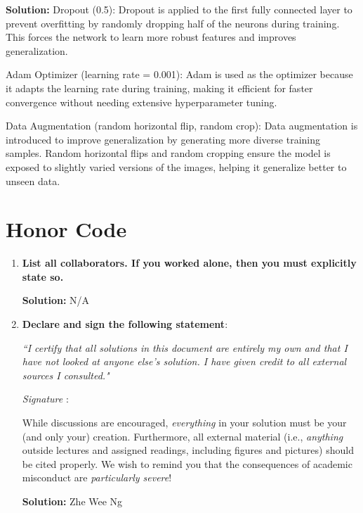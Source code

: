 \documentclass{article}
\newcommand{\Question}[1]{\Large \section{ #1 } \normalsize}
\newenvironment{solution}{\color{blue} \smallskip \textbf{Solution:}}{}
\begin{document}
\begin{solution}
Dropout (0.5): Dropout is applied to the first fully connected layer to prevent overfitting by randomly dropping half of the neurons during training. This forces the network to learn more robust features and improves generalization.

Adam Optimizer (learning rate = 0.001): Adam is used as the optimizer because it adapts the learning rate during training, making it efficient for faster convergence without needing extensive hyperparameter tuning.

Data Augmentation (random horizontal flip, random crop): Data augmentation is introduced to improve generalization by generating more diverse training samples. Random horizontal flips and random cropping ensure the model is exposed to slightly varied versions of the images, helping it generalize better to unseen data.


\end{solution}

\newpage
\Question{Honor Code}

\begin{enumerate}
    \item 
    \textbf{List all collaborators. If you worked alone, then you must explicitly state so.}

    \begin{solution}
N/A
    \end{solution}

    \item
    \textbf{Declare and sign the following statement}: 
    
    \textit{``I certify that all solutions in this document are entirely my own and that I have not looked at anyone else's solution. I have given credit to all external sources I consulted."}
    
    \textit{Signature} : \hrulefill
    
    While discussions are encouraged, \emph{everything} in your solution must be your (and only your) creation. 
    Furthermore, all external material  (i.e., \emph{anything} outside lectures and assigned
    readings, including figures and pictures) should be cited properly.
    We wish to remind you that the consequences of academic misconduct are \emph{particularly severe}!

    \begin{solution}
Zhe Wee Ng
    \end{solution}

\end{enumerate}
\end{document}
